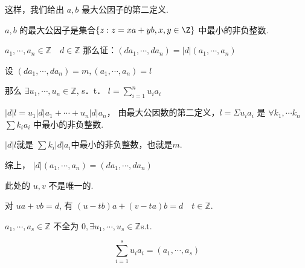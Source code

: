 这样，我们给出 $a, b$ 最大公因子的第二定义.

\begin{definition}
	$a, b$ 的最大公因子是集合$\left\{z:z= x a+y b, x, y \in \Z\right\} $ 中最小的非负整数.
	
\end{definition}
\begin{problem}
	$a_1 ,\cdots, a_n \in \mathbb{Z} \quad d \in \mathbb{Z}$
	那么证：$\left(d a_1, \cdots, d a_n\right)=|d|\left(a_1, \cdots, a_n\right)$
\end{problem}
\begin{solution}
	设 $\left(d a_1, \cdots, d a_n\right)=m,\left(a_1, \cdots, a_n\right)=l$
	
	那么 $\exists u_1, \cdots, u_n \in \mathbb{Z}$, s．t． $ l=\sum_{i=1}^{n} u_ia_i$
	
	$|d| l=u_1 |d|a_1+\cdots+u_n |d| a_n$，
	由最大公因数的第二定义，$l=\Sigma u_i a_i$ 是 $\forall k_1, \cdots k_n$  $\sum k_i a_i$ 中最小的非负整数.
	
	$|d| l$就是 $\sum k_i|d|a_i$中最小的非负整数，也就是$m$.
	
	综上，	$|d|\left(a_1, \cdots, a_n\right)=\left(d a_1, \cdots, d a_n\right)$
	
\end{solution}
\begin{remark}
	此处的 $u, v$ 不是唯一的.
	
	对 $u a+v b=d $, 有 $(u-t b) a+(v-t a) b=d \quad t \in \mathbb{Z}$.
\end{remark} 
\begin{corollary}
	$ a_1, \cdots, a_s \in \mathbb{Z}$ 不全为 $0, \exists u_1, \cdots, u_s \in \mathbb{Z}$s.t.
	
	$$
	\sum_{i=1}^s u_i a_i=\left(a_1, \cdots, a_s\right)
	$$
\end{corollary}
